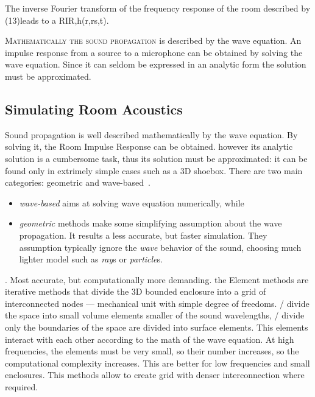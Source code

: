 The inverse Fourier transform of the frequency response of the room described by (13)leads to a RIR,h(r,rs,t).

\textsc{Mathematically the sound propagation} is described by the wave equation.
An impulse response from a source to a microphone can be obtained by solving the wave equation.
Since it can seldom be expressed in an analytic form the solution must be approximated.

\subsection{Simulating Room Acoustics}\label{sec:acoustics:simulators}
Sound propagation is well described mathematically by the wave equation.
By solving it, the Room Impulse Response can be obtained.
however its analytic solution is a cumbersome task, thus its solution must be approximated: it can be found only in extrimely
simple cases such as a 3D shoebox.
There are two main categories: geometric and wave-based~\cite{habets2010generator, reuk.github.io, Savioja2015goemetric}.
\begin{itemize}
    \item \textit{wave-based} aims at solving wave equation numerically, while
    \item \textit{geometric} methods make some simplifying assumption about the wave propagation.
    It results a less accurate, but faster simulation.
    They assumption typically ignore the \textit{wave} behavior of the sound, choosing much lighter model such as \textit{ray}s or \textit{particle}s.
\end{itemize}

.
Most accurate, but computationally more demanding.
the Element methods are iterative methods that divide the 3D bounded enclosure into a grid of interconnected nodes --- mechanical unit with simple degree of freedoms.
\FEMf/ divide the space into small volume elements smaller of the sound wavelengths,
\BEMf/ divide only the boundaries of the space are divided into surface elements.
This elements interact with each other according to the math of the wave equation.
At high frequencies, the elements must be very small, so their number increases, so the computational complexity increases.
This are better for low frequencies and small enclosures.
This methods allow to create grid with denser interconnection where required.

